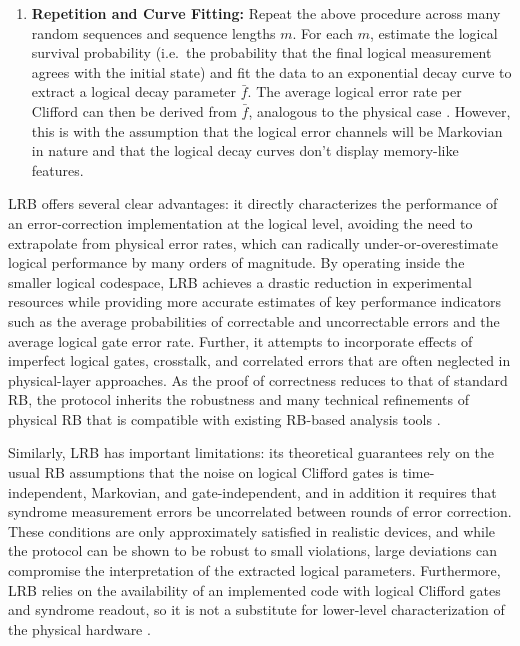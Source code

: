 \begin{enumerate}
  \item \textbf{Repetition and Curve Fitting:}
  Repeat the above procedure across many random sequences and sequence
  lengths $m$. For each $m$, estimate the logical survival probability
  (i.e.\ the probability that the final logical measurement agrees with
  the initial state) and fit the data to an exponential decay curve to
  extract a logical decay parameter $\bar{f}$. The average logical error
  rate per Clifford can then be derived from $\bar{f}$, analogous
  to the physical case \cite{Magesan2011PRL,Magesan2012PRA,Wallman2018}. However, this is with the assumption that the logical error channels will be Markovian in nature and that the logical decay curves don't display memory-like features.
\end{enumerate}

LRB offers several clear advantages: it directly characterizes the performance of an error-correction implementation at the logical level, avoiding the need to extrapolate from physical error rates, which can radically under-or-overestimate logical performance by many orders of magnitude. By operating inside the smaller logical codespace, LRB achieves a drastic reduction in experimental resources while providing more accurate estimates of key performance indicators such as the average probabilities of correctable and uncorrectable errors and the average logical gate error rate. Further, it attempts to incorporate effects of imperfect logical gates, crosstalk, and correlated errors that are often neglected in physical-layer approaches. As the proof of correctness reduces to that of standard RB, the protocol inherits the robustness and many technical refinements of physical RB that is compatible with existing RB-based analysis tools \cite{Combes2017}. 

Similarly, LRB has important limitations: its theoretical guarantees rely on the usual RB
assumptions that the noise on logical Clifford gates is time-independent, Markovian, and gate-independent,
and in addition it requires that syndrome measurement errors be uncorrelated between rounds of error correction. These conditions are only approximately satisfied in realistic devices, and while the protocol can be shown to be robust to small violations, large deviations can compromise the interpretation of the extracted logical parameters. Furthermore, LRB relies on the availability of an implemented code with logical
Clifford gates and syndrome readout, so it is not a substitute for lower-level characterization of the physical hardware \cite{Combes2017}.


